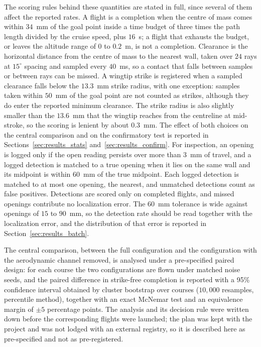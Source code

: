 \documentclass[final,5p,times]{elsarticle}
\begin{document}
The scoring rules behind these quantities are stated in full, since several of them affect the reported rates. A flight is a completion when the centre of mass comes within $34$~mm of the goal point inside a time budget of three times the path length divided by the cruise speed, plus $16$~s; a flight that exhausts the budget, or leaves the altitude range of $0$ to $0.2$~m, is not a completion. Clearance is the horizontal distance from the centre of mass to the nearest wall, taken over $24$ rays at $15^\circ$ spacing and sampled every $40$~ms, so a contact that falls between samples or between rays can be missed. A wingtip strike is registered when a sampled clearance falls below the $13.3$~mm strike radius, with one exception: samples taken within $50$~mm of the goal point are not counted as strikes, although they do enter the reported minimum clearance. The strike radius is also slightly smaller than the $13.6$~mm that the wingtip reaches from the centreline at mid-stroke, so the scoring is lenient by about $0.3$~mm. The effect of both choices on the central comparison and on the confirmatory test is reported in Sections~\ref{sec:results_stats} and~\ref{sec:results_confirm}. For inspection, an opening is logged only if the open reading persists over more than $3$~mm of travel, and a logged detection is matched to a true opening when it lies on the same wall and its midpoint is within $60$~mm of the true midpoint. Each logged detection is matched to at most one opening, the nearest, and unmatched detections count as false positives. Detections are scored only on completed flights, and missed openings contribute no localization error. The $60$~mm tolerance is wide against openings of $15$ to $90$~mm, so the detection rate should be read together with the localization error, and the distribution of that error is reported in Section~\ref{sec:results_batch}.

The central comparison, between the full configuration and the configuration with the aerodynamic channel removed, is analysed under a pre-specified paired design: for each course the two configurations are flown under matched noise seeds, and the paired difference in strike-free completion is reported with a 95\% confidence interval obtained by cluster bootstrap over courses ($10{,}000$ resamples, percentile method), together with an exact McNemar test and an equivalence margin of $\pm 5$ percentage points. The analysis and its decision rule were written down before the corresponding flights were launched; the plan was kept with the project and was not lodged with an external registry, so it is described here as pre-specified and not as pre-registered.
\end{document}
